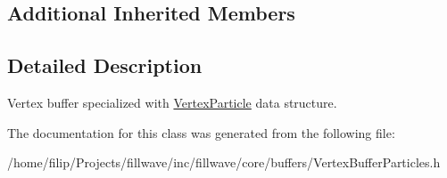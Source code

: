 \subsection*{Additional Inherited Members}


\subsection{Detailed Description}
Vertex buffer specialized with \hyperlink{structfillwave_1_1core_1_1VertexParticle}{Vertex\+Particle} data structure. 

The documentation for this class was generated from the following file\+:\begin{DoxyCompactItemize}
\item 
/home/filip/\+Projects/fillwave/inc/fillwave/core/buffers/Vertex\+Buffer\+Particles.\+h\end{DoxyCompactItemize}
